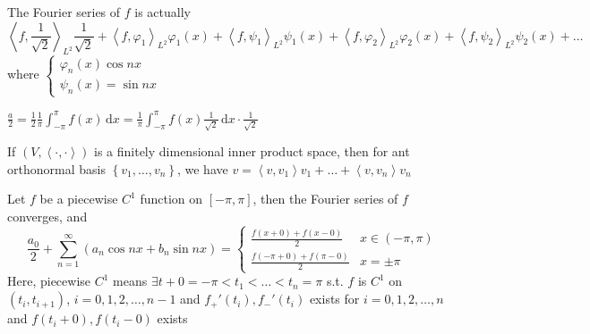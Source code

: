 
The Fourier series of $f$ is actually
$$\left<f,\frac{1}{\sqrt{2}}\right>_{L^2}\frac{1}{\sqrt{2}}+\left<f,\varphi_1\right>_{L^2}\varphi_1(x)+\left<f,\psi_1\right>_{L^2}\psi_1(x)+\left<f,\varphi_2\right>_{L^2}\varphi_2(x)+\left<f,\psi_2\right>_{L^2}\psi_2(x)+\dots$$
where $\begin{cases}
        \varphi_n(x)\cos nx \\
        \psi_n(x)=\sin nx
    \end{cases}$

$\frac{a}{2}=\frac{1}{2}\frac{1}{\pi}\int_{-\pi}^{\pi}f(x)\,\mathrm{d}x=\frac{1}{\pi}\int_{-\pi}^{\pi}f(x)\frac{1}{\sqrt{2}}\,\mathrm{d}x\cdot\frac{1}{\sqrt{2}}$

\begin{remark}
    If $\left(V,\left<\cdot,\cdot\right>\right)$ is a finitely dimensional inner product space, then for ant orthonormal basis $\left\{v_1,\dots,v_n\right\}$, we have $v=\left<v,v_1\right>v_1+\dots+\left<v,v_n\right>v_n$
\end{remark}

\begin{theorem}
    Let $f$ be a piecewise $C^1$ function on $[-\pi,\pi]$, then the Fourier series of $f$ converges, and
    $$\frac{a_0}{2}+\sum_{n=1}^{\infty}\left(a_n\cos nx+b_n\sin nx\right)=\begin{cases}
            \frac{f(x+0)+f(x-0)}{2}      & x\in(-\pi,\pi) \\
            \frac{f(-\pi+0)+f(\pi-0)}{2} & x=\pm\pi
        \end{cases}$$
    Here, piecewise $C^1$ means $\exists t+0=-\pi<t_1<\dots<t_n=\pi$ s.t. $f$ is $C^1$ on $(t_i,t_{i+1})$, $i=0,1,2,\dots,n-1$ and $f_+'(t_i),f_-'(t_i)$ exists for $i=0,1,2,\dots,n$ and $f(t_i+0),f(t_i-0)$ exists
\end{theorem}

